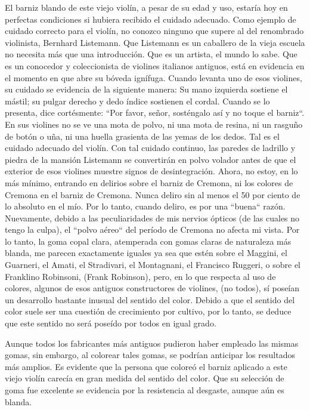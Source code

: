 \documentclass[12pt]{book}
\begin{document}
El barniz blando de este viejo violín, a pesar de su edad y uso, estaría hoy en perfectas condiciones si hubiera recibido el cuidado adecuado. Como ejemplo de cuidado correcto para el violín, no conozco ninguno que supere al del renombrado violinista, Bernhard Listemann. Que Listemann es un caballero de la vieja escuela no necesita más que una introducción. Que es un artista, el mundo lo sabe. Que es un conocedor y coleccionista de violines italianos antiguos, está en evidencia en el momento en que abre su bóveda ignífuga. Cuando levanta uno de esos violines, su cuidado se evidencia de la siguiente manera: Su mano izquierda sostiene el mástil; su pulgar derecho y dedo índice sostienen el cordal. Cuando se lo presenta, dice cortésmente: ``Por favor, señor, sosténgalo así y no toque el barniz``. En sus violines no se ve una mota de polvo, ni una mota de resina, ni un rasguño de botón o uña, ni una huella grasienta de las yemas de los dedos. Tal es el cuidado adecuado del violín. Con tal cuidado continuo, las paredes de ladrillo y piedra de la mansión Listemann se convertirán en polvo volador antes de que el exterior de esos violines muestre signos de desintegración. Ahora, no estoy, en lo más mínimo, entrando en delirios sobre el barniz de Cremona, ni los colores de Cremona en el barniz de Cremona. Nunca deliro sin al menos el 50 por ciento de lo absoluto en el mío. Por lo tanto, cuando deliro, es por una ``buena`` razón. Nuevamente, debido a las peculiaridades de mis nervios ópticos (de las cuales no tengo la culpa), el ``polvo aéreo`` del período de Cremona no afecta mi vista. Por lo tanto, la goma copal clara, atemperada con gomas claras de naturaleza más blanda, me parecen exactamente iguales ya sea que estén sobre el Maggini, el Guarneri, el Amati, el Stradivari, el Montagnani, el Francisco Ruggeri, o sobre el Franklino Robinsoni, (Frank Robinson), pero, en lo que respecta al uso de colores, algunos de esos antiguos constructores de violines, (no todos), sí poseían un desarrollo bastante inusual del sentido del color. Debido a que el sentido del color suele ser una cuestión de crecimiento por cultivo, por lo tanto, se deduce que este sentido no será poseído por todos en igual grado.

Aunque todos los fabricantes más antiguos pudieron haber empleado las mismas gomas, sin embargo, al colorear tales gomas, se podrían anticipar los resultados más amplios. Es evidente que la persona que coloreó el barniz aplicado a este viejo violín carecía en gran medida del sentido del color. Que su selección de goma fue excelente se evidencia por la resistencia al desgaste, aunque aún es blanda.
\end{document}
